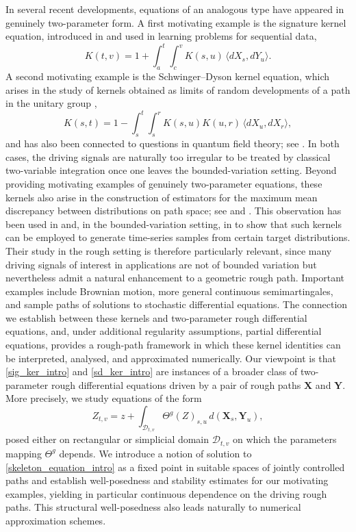 \documentclass{article}%
\begin{document}
In several recent developments, equations of an analogous type have appeared in genuinely two-parameter form. A first motivating example is the signature kernel equation, introduced in \cite{salvi2021signature} and used in learning problems for sequential data,
\begin{equation}\label{sig_ker_intro}
K(t,v) = 1 + \int_a^t \int_c^v K(s,u)\, \langle dX_s, dY_u \rangle.
\end{equation}
A second motivating example is the Schwinger--Dyson kernel equation, which arises in the study of kernels obtained as limits of random developments of a path in the unitary group \cite{cass2024free},
\begin{equation}\label{sd_ker_intro}
K(s,t) = 1 - \int_s^t \int_s^r K(s,u)K(u,r)\, \langle dX_u, dX_r \rangle,
\end{equation}
and has also been connected to questions in quantum field theory; see \cite{crew2025quantum}. 
In both cases, the driving signals are naturally too irregular to be treated by classical two-variable integration once one leaves the bounded-variation setting.
Beyond providing motivating examples of genuinely two-parameter equations, these kernels also arise in the construction of estimators for the maximum mean discrepancy between distributions on path space; see \cite[Sections 7--8]{chevyrev2022signature} and \cite{chevyrev2016characteristic}. This observation has been used in \cite{issa2023non} and, in the bounded-variation setting, in \cite{lou2023pcf} to show that such kernels can be employed to generate time-series samples from certain target distributions. Their study in the rough setting is therefore particularly relevant, since many driving signals of interest in applications are not of bounded variation but nevertheless admit a natural enhancement to a geometric rough path. Important examples include Brownian motion, more general continuous semimartingales, and sample paths of solutions to stochastic differential equations. The connection we establish between these kernels and two-parameter rough differential equations, and, under additional regularity assumptions, partial differential equations, provides a rough-path framework in which these kernel identities can be interpreted, analysed, and approximated numerically.
Our viewpoint is that \eqref{sig_ker_intro} and \eqref{sd_ker_intro} are instances of a broader class of two-parameter rough differential equations driven by a pair of rough paths $\mathbf{X}$ and $\mathbf{Y}$.
More precisely, we study equations of the form
\begin{equation}\label{skeleton_equation_intro}
Z_{t,v}
= z
+ \int_{\mathcal{D}_{t,v}}
\Theta^g\left(Z\right)_{s,u}\,
d(\mathbf{X}_s,\mathbf{Y}_u),
\end{equation}
posed either on rectangular or simplicial domain $\mathcal{D}_{t,v}$ on which the parameters mapping $\Theta^g$ depends.
We introduce a notion of solution to \eqref{skeleton_equation_intro} as a fixed point in suitable spaces of jointly controlled paths and establish well-posedness and stability estimates for our motivating examples, yielding in particular continuous dependence on the driving rough paths.
This structural well-posedness also leads naturally to numerical approximation schemes.
\end{document}
